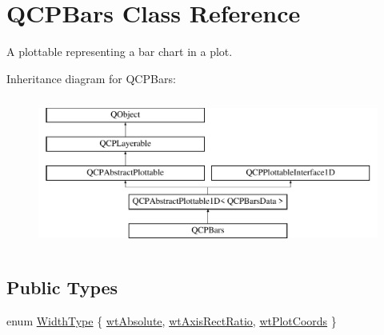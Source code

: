 \hypertarget{class_q_c_p_bars}{}\section{Q\+C\+P\+Bars Class Reference}
\label{class_q_c_p_bars}


A plottable representing a bar chart in a plot.  


Inheritance diagram for Q\+C\+P\+Bars\+:\begin{figure}[H]
\begin{center}
\leavevmode
\includegraphics[height=5.000000cm]{class_q_c_p_bars}
\end{center}
\end{figure}
\subsection*{Public Types}
\begin{DoxyCompactItemize}
\item 
enum \mbox{\hyperlink{class_q_c_p_bars_a65dbbf1ab41cbe993d71521096ed4649}{Width\+Type}} \{ \mbox{\hyperlink{class_q_c_p_bars_a65dbbf1ab41cbe993d71521096ed4649ab74315c9aa77df593c58dd25dfc0de35}{wt\+Absolute}}, 
\mbox{\hyperlink{class_q_c_p_bars_a65dbbf1ab41cbe993d71521096ed4649a90bc09899361ad3422ff277f7c790ffe}{wt\+Axis\+Rect\+Ratio}}, 
\mbox{\hyperlink{class_q_c_p_bars_a65dbbf1ab41cbe993d71521096ed4649aad3cc60ae1bfb1160a30237bee9eaf10}{wt\+Plot\+Coords}}
 \}
\end{DoxyCompactItemize}
